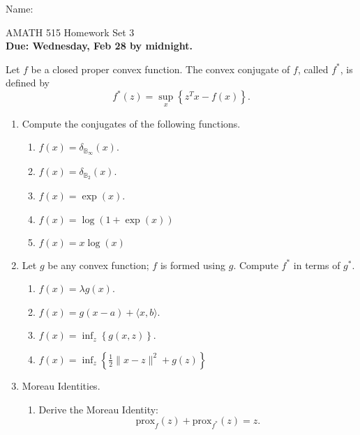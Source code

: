 \documentclass[11pt]{amsart}
\begin{document}
{\Large Name:}  \\
\begin{center}
\Large AMATH 515 \hskip 2in Homework Set 3\\
{\bf Due: Wednesday, Feb 28 by midnight.}
\end{center}
\bigskip

Let $f$ be a closed proper convex function. The convex conjugate of $f$, called $f^*$, is defined by 
\[
f^*(z) = \sup_x \left\{ z^Tx - f(x)\right\}.
\]


\begin{enumerate}



\item  Compute the conjugates of the following functions.  
\begin{enumerate}
\item $f(x) = \delta_{\mathbb{B}_{\infty}}(x)$.
\item $f(x) = \delta_{\mathbb{B}_{2}}(x)$.
\item $f(x) = \exp(x)$.
\item $f(x) =  \log(1+\exp(x))$
\item $f(x) = x\log(x)$
\end{enumerate}


\bigskip\bigskip



\item  Let $g$ be any convex function; $f$ is formed using $g$.
Compute $f^*$ in terms of $g^*$.  
\begin{enumerate}
\item $f(x) = \lambda g(x)$.
\item $f(x) = g(x-a) + \langle x, b \rangle$.
\item $f(x) = \inf_z \left\{g(x,z)\right\}$. 
\item $f(x) = \inf_z \left\{\frac{1}{2}\|x-z\|^2 + g(z)\right\}$
\end{enumerate}

\bigskip\bigskip

\item Moreau Identities.
\begin{enumerate}
\item  Derive the Moreau Identity: 
\[
\mbox{prox}_{f}(z) + \mbox{prox}_{f^*}(z) = z. 
\]


\bigskip \bigskip



\end{enumerate}
\end{enumerate}
\end{document}

